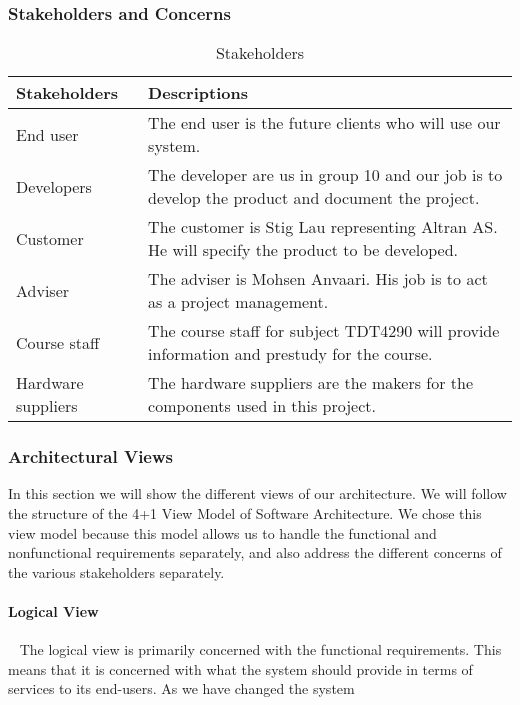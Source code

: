 \documentclass[../document]{subfiles}
\begin{document}
\subsubsection{Stakeholders and Concerns}
\begin{table}[H]
	\caption{Stakeholders}
	\begin{tabularx}{\textwidth}{|X|X|}
		\hline
		\textbf{Stakeholders}	& \textbf{Descriptions} \\ \hline
		End user				& The end user is the future clients who will use our system.  \\ \hline
		Developers				& The developer are us in group 10 and our job is to develop the product and document the project.  \\ \hline
		Customer				& The customer is Stig Lau representing \gls{Altran} AS. He will specify the product to be developed.  \\ \hline
		Adviser					& The adviser is Mohsen Anvaari. His job is to act as a project management.  \\ \hline
		Course staff			& The course staff for subject TDT4290 will provide information and prestudy for the course.  \\ \hline
		Hardware suppliers		& The hardware suppliers are the makers for the components used in this project.  \\ \hline
	\end{tabularx}
\end{table}

\subsubsection{Architectural Views}
In this section we will show the different views of our architecture. We will follow the structure of the 4+1 View Model of Software Architecture. We chose this view model because this model allows us to handle the functional and nonfunctional requirements separately, and also address the different concerns of the various stakeholders separately.

\paragraph{Logical View} \ \newline				
The logical view is primarily concerned with the functional requirements. This means that it is concerned with what the system should provide in terms of services to its end-users. As we have changed the system 
\end{document}
